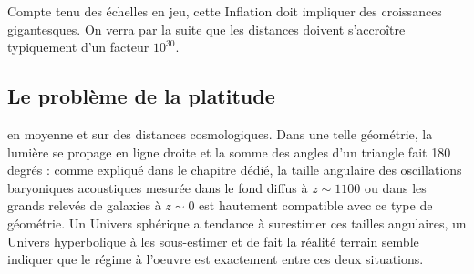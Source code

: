 Compte tenu des échelles en jeu, cette Inflation doit impliquer des croissances gigantesques. On verra par la suite que les distances doivent s'accroître typiquement d'un facteur $10^{30}$.


\subsection{Le problème de la platitude}
 en moyenne et sur des distances cosmologiques. Dans une telle géométrie, la lumière se propage en ligne droite et la somme des angles d'un triangle fait 180 degrés : comme expliqué dans le chapitre dédié, la taille angulaire des oscillations baryoniques acoustiques mesurée dans le fond diffus à $z\sim1100$ ou dans les grands relevés de galaxies à $z\sim 0$ est hautement compatible avec ce type de géométrie. Un Univers sphérique a tendance à surestimer ces tailles angulaires, un Univers hyperbolique à les sous-estimer et de fait la réalité terrain semble indiquer que le régime à l'oeuvre est exactement entre ces deux situations.

